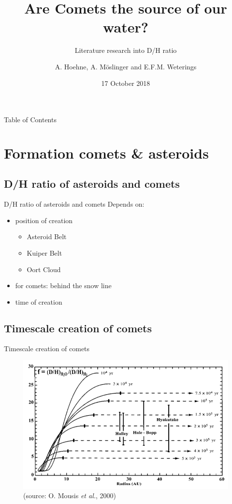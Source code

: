 \documentclass[11pt, aspectratio=169]{beamer}
\author{A. Hoehne, A. M\"{o}slinger and E.F.M. Weterings}
\title{Are Comets the source of our water?}
\subtitle{Literature research into D/H ratio}
\institute{Lule\aa \ University of Technology}
\date{17 October 2018}
\begin{document}
\begin{frame}
\titlepage
\end{frame}

\begin{frame}[t]{Table of Contents}
\tableofcontents[
    currentsection,
    sectionstyle=show/show,
    subsectionstyle=show/show,
  ]
\end{frame}



\section{Formation comets \& asteroids}
\subsection{D/H ratio of asteroids and comets}
\begin{frame}[t]{D/H ratio of asteroids and comets}
Depends on:
\begin{itemize}
	\item position of creation
	\begin{itemize}
		\item Asteroid Belt
		\item Kuiper Belt
		\item Oort Cloud
	\end{itemize}
	\item for comets: behind the snow line
	\item time of creation
\end{itemize}
\end{frame}


\subsection{Timescale creation of comets}
\begin{frame}[t]{Timescale creation of comets}
\begin{figure}
	\centering
	\includegraphics[height=0.7\textheight]{figures/D_H_distance_time} \\
	\small(source: O. Mousis \textit{et al.}, 2000)
\end{figure}
\end{frame}
\end{document}
